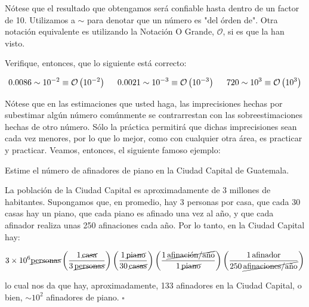N\'otese que el resultado que obtengamos ser\'a confiable hasta dentro de un factor de 10. Utilizamos a $\sim$ para denotar que un n\'umero es "del \'orden de". Otra notaci\'on equivalente es utilizando la Notaci\'on O Grande, $\mathcal{O}$, si es que la han visto. 

\begin{ejercicio}
Verifique, entonces, que lo siguiente est\'a correcto:

\begin{equation*}
    \SI{0.0086}{} \sim 10^{-2}\equiv \mathcal{O}\left(10^{-2}\right) \hspace{5mm} \SI{0.0021}{} \sim 10^{-3} \equiv \mathcal{O}\left(10^{-3}\right) \hspace{5mm} \SI{720}{} \sim 10^{3} \equiv \mathcal{O}\left(10^{3}\right)
\end{equation*}

\end{ejercicio}

N\'otese que en las estimaciones que usted haga, las imprecisiones hechas por subestimar alg\'un n\'umero com\'unmente se contrarrestan con las sobreestimaciones hechas de otro n\'umero. S\'olo la pr\'actica permitir\'a que dichas imprecisiones sean cada vez menores, por lo que lo mejor, como con cualquier otra \'area, es practicar y practicar. Veamos, entonces, el siguiente famoso ejemplo:

\begin{ejemplo}
Estime el n\'umero de afinadores de piano en la Ciudad Capital de Guatemala.
\end{ejemplo}

\begin{solution*}
La poblaci\'on de la Ciudad Capital es aproximadamente de 3 millones de habitantes. Supongamos que, en promedio, hay 3 personas por casa, que cada 30 casas hay un piano, que cada piano es afinado una vez al a\~no, y que cada afinador realiza unas 250 afinaciones cada a\~no. Por lo tanto, en la Ciudad Capital hay:

\[
    3\times10^{6}\cancel{\text{personas}} \left( \frac{1\,\cancel{\text{casa}}}{3\,\cancel{\text{personas}}} \right) \left( \frac{1\,\cancel{\text{piano}}}{30\,\cancel{\text{casas}}} \right) \left( \frac{1\,\cancel{\text{afinaci\'on/a\~no}}}{1\,\cancel{\text{piano}}} \right) \left( \frac{1\,\text{afinador}}{250\,\cancel{\text{afinaciones/a\~no}}} \right)
\]

lo cual nos da que hay, aproximadamente, 133 afinadores en la Ciudad Capital, o bien, $\sim 10^2$ afinadores de piano. \hfill $\square$

\end{solution*}

